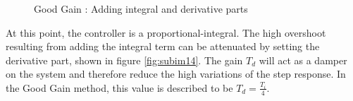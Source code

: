 \begin{figure}[H]
\hfill
{}
\hfill
{}
\hfill

\caption{Good Gain : Adding integral and derivative parts}
\end{figure}

At this point, the controller is a proportional-integral. The high overshoot resulting from adding the integral term can be attenuated by setting the derivative part, shown in figure \ref{fig:subim14}. The gain $T_d$ will act as a damper on the system and therefore reduce the high variations of the step response. In the Good Gain method, this value is described to be $T_d = \frac{T_i}{4}$.


